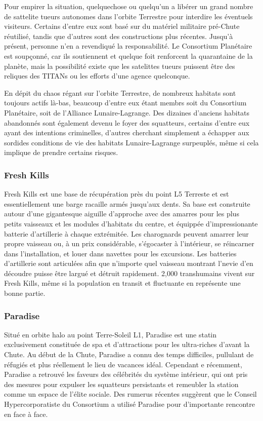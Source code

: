 Pour empirer la situation, quelquechose ou quelqu'un a libérer un grand nombre de sattelite tueurs autonomes dans l'orbite Terrestre pour interdire les éventuels visiteurs. Certains d'entre eux sont basé sur du matériel militaire pré-Chute réutilisé, tandis que d'autres sont des constructions plus récentes. Jusqu'à présent, personne n'en a revendiqué la responsabilité. Le Consortium Planétaire est soupçonné, car ils soutiennent et quelque foit renforcent la quarantaine de la planète, mais la possibilité existe que les satelittes tueurs puissent être des reliques des TITANs ou les efforts d'une agence quelconque. 

En dépit du chaos régant sur l'orbite Terrestre, de nombreux habitats sont toujours actifs là-bas, beaucoup d'entre eux étant membrs soit du Consortium Planétaire, soit de l'Alliance Lunaire-Lagrange. Des dizaines d'anciens habitats abandonnés sont également devenu le foyer des squatteurs, certains d'entre eux ayant des intentions criminelles, d'autres cherchant simplement a échapper aux sordides conditions de vie des habitats Lunaire-Lagrange surpeuplés, même si cela implique de prendre certains risques. 

\subsubsection{Fresh Kills} \label{sec:fresh-kills} 

Fresh Kills est une base de récupération près du point L5 Terreste et est essentiellement une barge racaille armés jusqu'aux dents. Sa base est construite autour d'une gigantesque aiguille d'approche avec des amarres pour les plus petits vaisseaux et les modules d'habitats du centre, et équippée d'impressionante batterie d'artillerie à chaque extrémitée. Les charognards peuvent amarrer leur propre vaisseau ou, à un prix considérable, s'égocaster à l'intérieur, se réincarner dans l'installation, et louer dans navettes pour les excursions. Les batteries d'artillerie sont articulées afin que n'importe quel vaisseau montrant l'nevie d'en découdre puisse être largué et détruit rapidement. 2,000 transhumains vivent sur Fresh Kills, même si la population en transit et fluctuante en représente une bonne partie. 

\subsubsection{Paradise} \label{sec:paradise} 

Situé en orbite halo au point Terre-Soleil L1, Paradise est une statin exclusivement constituée de spa et d'attractions pour les ultra-riches d'avant la Chute. Au début de la Chute, Paradise a connu des temps difficiles, pullulant de réfugiés et plus réellement le lieu de vacances idéal. Cependant e récemment, Paradise a retrouvé les faveurs des célébrités du système intérieur, qui ont pris des mesures pour expulser les squatteurs persistants et remeubler la station comme un espace de l'élite sociale. Des rumerus récentes suggèrent que le Conseil Hypercorporatiste du Consortium a utilisé Paradise pour d'importante rencontre en face à face. 

